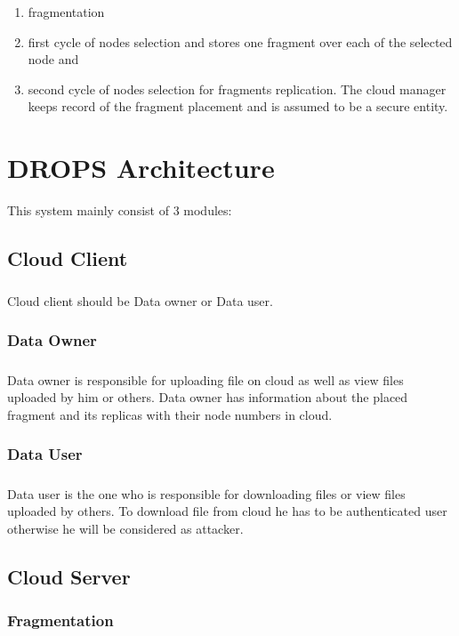 \begin{enumerate}
	\item fragmentation
	\item first cycle of nodes selection and stores one fragment over each of the selected node and
	\item second cycle of nodes selection for fragments replication. The cloud manager keeps
	record of the fragment placement and is assumed to be a secure entity.
\end{enumerate}

\chapter{ DROPS Architecture}

This system mainly consist of 3 modules:
\section{Cloud Client}
\paragraph*{} 
Cloud client should be Data owner or Data user.
\subsection{Data Owner}
\paragraph*{}
Data owner is responsible for uploading file on cloud as well as view files uploaded by him or others. Data owner has information about the placed fragment and its replicas with their node numbers in cloud. 
\subsection{Data User}
\paragraph*{}
Data user is the one who is responsible for downloading files or view files uploaded by others. To download file from cloud he has to be authenticated user otherwise he will be considered as attacker.
\section{Cloud Server}
\subsection{Fragmentation}
